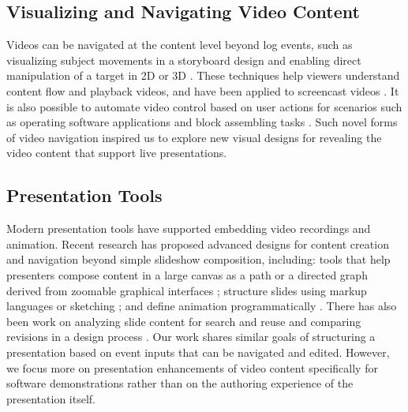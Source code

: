 \subsection{Visualizing and Navigating Video Content}
Videos can be navigated at the content level beyond log events, such as visualizing subject movements in a storyboard design \cite{goldman2006schematic} and enabling direct manipulation of a target in 2D \cite{Dragicevic:2008:VBD:1357054.1357096,Goldman:2008:VOA:1449715.1449719,Karrer:2008:DDM:1357054.1357097} or 3D \cite{Nguyen:2013:DMV:2470654.2466150}. These techniques help viewers understand content flow and playback videos, and have been applied to screencast videos \cite{Denoue:2013:RDM:2451176.2451190}. It is also possible to automate video control based on user actions for scenarios such as operating software applications \cite{Pongnumkul:2011ju} and block assembling tasks \cite{Gupta:2012ku}. Such novel forms of video navigation inspired us to explore new visual designs for revealing the video content that support live presentations.

\subsection{Presentation Tools}
Modern presentation tools have supported embedding video recordings and animation. Recent research has proposed advanced designs for content creation and navigation beyond simple slideshow composition, including: tools that help presenters compose content in a large canvas \cite{Good:2002:ZUI:941231.941236} as a path \cite{Lichtschlag:2009:FTA:1518701.1518786} or a directed graph \cite{Spicer:2012:NAD:2379790.2379795} derived from zoomable graphical interfaces \cite{Bederson:1994:PZG:192426.192435}; structure slides using markup languages \cite{Edge:2013:HDP:2470654.2470749} or sketching \cite{Li:2003:SIP:958432.958476}; and define animation programmatically \cite{Zongker:2003:CAP:846276.846319}. There has also been work on analyzing slide content for search and reuse \cite{Bergman:2010:OWP:1719970.1719999,Sharmin:2012:SCC:2166966.2166992} and comparing revisions in a design process \cite{Drucker:2006:CMM:1166253.1166263}. Our work shares similar goals of structuring a presentation based on event inputs that can be navigated and edited. However, we focus more on presentation enhancements of video content specifically for software demonstrations rather than on the authoring experience of the presentation itself.

